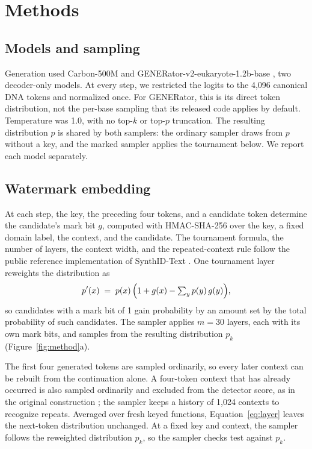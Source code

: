 \documentclass[10pt,twocolumn]{article}
\begin{document}
\section{Methods}
\label{sec:methods}

\subsection{Models and sampling}

Generation used Carbon-500M \cite{carbon2026,carbon500m} and GENERator-v2-eukaryote-1.2b-base
\cite{generatorv22026,generatorv2checkpoint}, two decoder-only models. At every step, we restricted the logits to the 4{,}096 canonical
DNA tokens and normalized once. For GENERator, this is its direct token distribution, not the
per-base sampling that its released code applies by default. Temperature was 1.0, with no top-$k$
or top-$p$ truncation. The resulting distribution $p$ is shared by both samplers: the ordinary
sampler draws from $p$ without a key, and the marked sampler applies the tournament below. We
report each model separately.

\subsection{Watermark embedding}

At each step, the key, the preceding four tokens, and a candidate token determine the candidate's
mark bit $g$, computed with HMAC-SHA-256 over the key, a fixed domain label, the context, and the
candidate. The tournament formula, the number of layers, the context width, and the
repeated-context rule follow the public reference implementation of SynthID-Text
\cite{synthidtextcode}. One tournament layer reweights the distribution as
\begin{equation}
p'(x) \;=\; p(x)\,\Bigl(1 + g(x) - \textstyle\sum_y p(y)\, g(y)\Bigr),
\label{eq:layer}
\end{equation}
so candidates with a mark bit of 1 gain probability by an amount set by the total probability of
such candidates. The sampler applies $m = 30$ layers, each with its own mark bits, and samples from
the resulting distribution $p_k$ (Figure~\ref{fig:method}a).

The first four generated tokens are sampled ordinarily, so every later context can be rebuilt from
the continuation alone. A four-token context that has already occurred is also sampled ordinarily
and excluded from the detector score, as in the original construction
\cite{dathathri2024scalable}; the sampler keeps a history of 1{,}024 contexts to recognize
repeats. Averaged over fresh keyed functions, Equation~\ref{eq:layer} leaves the next-token
distribution unchanged. At a fixed key and context, the sampler follows the reweighted
distribution $p_k$, so the sampler checks test against $p_k$.
\end{document}
